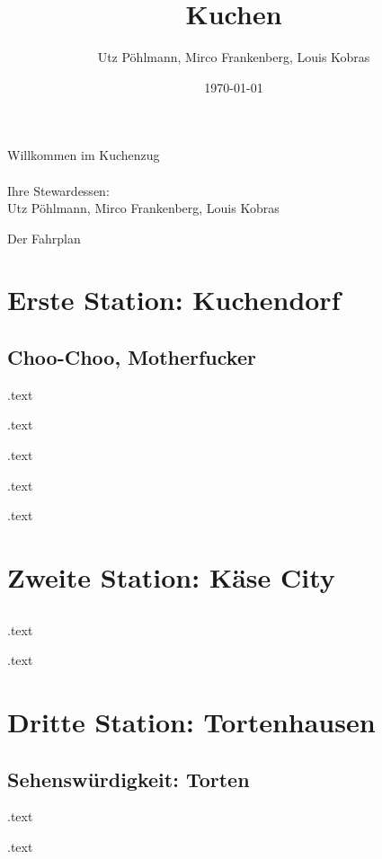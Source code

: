 \documentclass[pdf]{beamer}
\title{Kuchen}
\subtitle{}
\author{Utz Pöhlmann, Mirco Frankenberg, Louis Kobras}
\date{\footnotesize\today}
\begin{document}
\begin{frame}
	\titlepage\thispagestyle{empty}
\end{frame}
\begin{frame}
	\centering
	\Large{Willkommen im Kuchenzug}\\
	\-\\
	\large{Ihre Stewardessen:}\\
	\large{Utz Pöhlmann, Mirco Frankenberg, Louis Kobras}
\end{frame}
\begin{frame}{Der Fahrplan}
	\tableofcontents[hidesubsections]
\end{frame}
	\section{Erste Station: Kuchendorf}
	\subsection*{Choo-Choo, Motherfucker}
		\begin{frame}
			.text
		\end{frame}
		\begin{frame}
		.text
		\end{frame}
		\begin{frame}
		.text
		\end{frame}
		\begin{frame}
		.text
		\end{frame}
		\begin{frame}
		.text
		\end{frame}
	\section{Zweite Station: Käse City}
	\subsection*{}
		\begin{frame}
			.text
		\end{frame}
		\begin{frame}
		.text
		\end{frame}
	\section{Dritte Station: Tortenhausen}
		\subsection{Sehenswürdigkeit: Torten}
			\begin{frame}
				.text
			\end{frame}
			\begin{frame}
			.text
			\end{frame}
\end{document}
